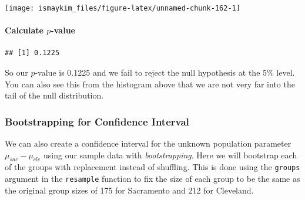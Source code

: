 \documentclass[]{tufte-book}
\newenvironment{Shaded}{\begin{snugshade}}{\end{snugshade}}
\newcommand{\KeywordTok}[1]{\textcolor[rgb]{0.13,0.29,0.53}{\textbf{{#1}}}}
\newcommand{\DataTypeTok}[1]{\textcolor[rgb]{0.13,0.29,0.53}{{#1}}}
\newcommand{\DecValTok}[1]{\textcolor[rgb]{0.00,0.00,0.81}{{#1}}}
\newcommand{\StringTok}[1]{\textcolor[rgb]{0.31,0.60,0.02}{{#1}}}
\newcommand{\OtherTok}[1]{\textcolor[rgb]{0.56,0.35,0.01}{{#1}}}
\newcommand{\NormalTok}[1]{{#1}}
\theoremstyle{definition}
\theoremstyle{definition}
\theoremstyle{remark}
\begin{document}
\begin{center}\texttt{[image: ismaykim\_files/figure-latex/unnamed-chunk-162-1]} \end{center}

\paragraph{\texorpdfstring{Calculate
\(p\)-value}{Calculate p-value}}\label{calculate-p-value-3}

\begin{Shaded}
\end{Shaded}

\begin{verbatim}
## [1] 0.1225
\end{verbatim}

So our \(p\)-value is 0.1225 and we fail to reject the null hypothesis
at the 5\% level. You can also see this from the histogram above that we
are not very far into the tail of the null distribution.

\subsubsection{Bootstrapping for Confidence
Interval}\label{bootstrapping-for-confidence-interval-3}

We can also create a confidence interval for the unknown population
parameter \(\mu_{sac} - \mu_{cle}\) using our sample data with
\emph{bootstrapping}. Here we will bootstrap each of the groups with
replacement instead of shuffling. This is done using the \texttt{groups}
argument in the \texttt{resample} function to fix the size of each group
to be the same as the original group sizes of 175 for Sacramento and 212
for Cleveland.

\begin{Shaded}
\end{Shaded}
\end{document}
